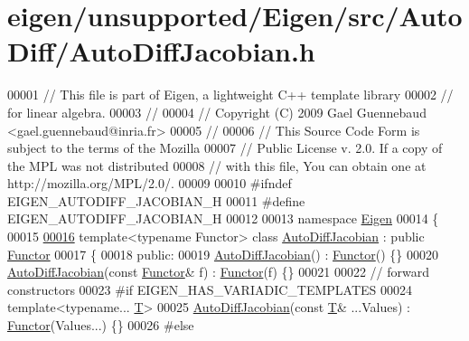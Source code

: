 \hypertarget{eigen_2unsupported_2_eigen_2src_2_auto_diff_2_auto_diff_jacobian_8h_source}{}\section{eigen/unsupported/\+Eigen/src/\+Auto\+Diff/\+Auto\+Diff\+Jacobian.h}
\label{eigen_2unsupported_2_eigen_2src_2_auto_diff_2_auto_diff_jacobian_8h_source}

\begin{DoxyCode}
00001 \textcolor{comment}{// This file is part of Eigen, a lightweight C++ template library}
00002 \textcolor{comment}{// for linear algebra.}
00003 \textcolor{comment}{//}
00004 \textcolor{comment}{// Copyright (C) 2009 Gael Guennebaud <gael.guennebaud@inria.fr>}
00005 \textcolor{comment}{//}
00006 \textcolor{comment}{// This Source Code Form is subject to the terms of the Mozilla}
00007 \textcolor{comment}{// Public License v. 2.0. If a copy of the MPL was not distributed}
00008 \textcolor{comment}{// with this file, You can obtain one at http://mozilla.org/MPL/2.0/.}
00009 
00010 \textcolor{preprocessor}{#ifndef EIGEN\_AUTODIFF\_JACOBIAN\_H}
00011 \textcolor{preprocessor}{#define EIGEN\_AUTODIFF\_JACOBIAN\_H}
00012 
00013 \textcolor{keyword}{namespace }\hyperlink{namespace_eigen}{Eigen}
00014 \{
00015 
\hyperlink{class_eigen_1_1_auto_diff_jacobian}{00016} \textcolor{keyword}{template}<\textcolor{keyword}{typename} Functor> \textcolor{keyword}{class }\hyperlink{class_eigen_1_1_auto_diff_jacobian}{AutoDiffJacobian} : \textcolor{keyword}{public} 
      \hyperlink{struct_functor}{Functor}
00017 \{
00018 \textcolor{keyword}{public}:
00019   \hyperlink{class_eigen_1_1_auto_diff_jacobian}{AutoDiffJacobian}() : \hyperlink{struct_functor}{Functor}() \{\}
00020   \hyperlink{class_eigen_1_1_auto_diff_jacobian}{AutoDiffJacobian}(\textcolor{keyword}{const} \hyperlink{struct_functor}{Functor}& f) : \hyperlink{struct_functor}{Functor}(f) \{\}
00021 
00022   \textcolor{comment}{// forward constructors}
00023 \textcolor{preprocessor}{#if EIGEN\_HAS\_VARIADIC\_TEMPLATES}
00024   \textcolor{keyword}{template}<\textcolor{keyword}{typename}... \hyperlink{group___sparse_core___module}{T}>
00025   \hyperlink{class_eigen_1_1_auto_diff_jacobian}{AutoDiffJacobian}(\textcolor{keyword}{const} \hyperlink{group___sparse_core___module}{T}& ...Values) : \hyperlink{struct_functor}{Functor}(Values...) \{\}
00026 \textcolor{preprocessor}{#else}

\end{DoxyCode}
